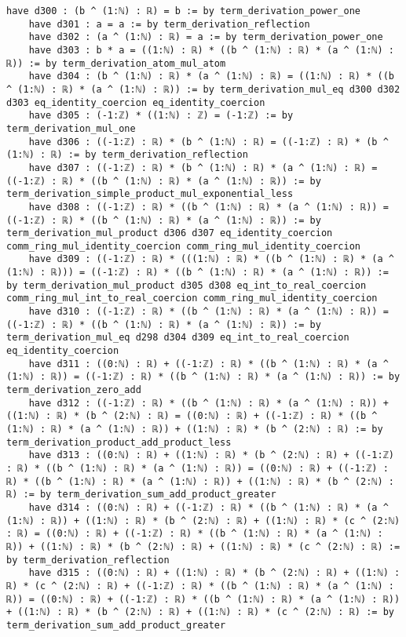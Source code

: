 \documentclass{article}
\begin{document}
\begin{tcolorbox}[colback=white!10, width=\linewidth]
\begin{lstlisting}[language=Lean4]
    have d300 : (b ^ (1:ℕ) : ℝ) = b := by term_derivation_power_one
    have d301 : a = a := by term_derivation_reflection
    have d302 : (a ^ (1:ℕ) : ℝ) = a := by term_derivation_power_one
    have d303 : b * a = ((1:ℕ) : ℝ) * ((b ^ (1:ℕ) : ℝ) * (a ^ (1:ℕ) : ℝ)) := by term_derivation_atom_mul_atom
    have d304 : (b ^ (1:ℕ) : ℝ) * (a ^ (1:ℕ) : ℝ) = ((1:ℕ) : ℝ) * ((b ^ (1:ℕ) : ℝ) * (a ^ (1:ℕ) : ℝ)) := by term_derivation_mul_eq d300 d302 d303 eq_identity_coercion eq_identity_coercion
    have d305 : (-1:ℤ) * ((1:ℕ) : ℤ) = (-1:ℤ) := by term_derivation_mul_one
    have d306 : ((-1:ℤ) : ℝ) * (b ^ (1:ℕ) : ℝ) = ((-1:ℤ) : ℝ) * (b ^ (1:ℕ) : ℝ) := by term_derivation_reflection
    have d307 : ((-1:ℤ) : ℝ) * (b ^ (1:ℕ) : ℝ) * (a ^ (1:ℕ) : ℝ) = ((-1:ℤ) : ℝ) * ((b ^ (1:ℕ) : ℝ) * (a ^ (1:ℕ) : ℝ)) := by term_derivation_simple_product_mul_exponential_less
    have d308 : ((-1:ℤ) : ℝ) * ((b ^ (1:ℕ) : ℝ) * (a ^ (1:ℕ) : ℝ)) = ((-1:ℤ) : ℝ) * ((b ^ (1:ℕ) : ℝ) * (a ^ (1:ℕ) : ℝ)) := by term_derivation_mul_product d306 d307 eq_identity_coercion comm_ring_mul_identity_coercion comm_ring_mul_identity_coercion
    have d309 : ((-1:ℤ) : ℝ) * (((1:ℕ) : ℝ) * ((b ^ (1:ℕ) : ℝ) * (a ^ (1:ℕ) : ℝ))) = ((-1:ℤ) : ℝ) * ((b ^ (1:ℕ) : ℝ) * (a ^ (1:ℕ) : ℝ)) := by term_derivation_mul_product d305 d308 eq_int_to_real_coercion comm_ring_mul_int_to_real_coercion comm_ring_mul_identity_coercion
    have d310 : ((-1:ℤ) : ℝ) * ((b ^ (1:ℕ) : ℝ) * (a ^ (1:ℕ) : ℝ)) = ((-1:ℤ) : ℝ) * ((b ^ (1:ℕ) : ℝ) * (a ^ (1:ℕ) : ℝ)) := by term_derivation_mul_eq d298 d304 d309 eq_int_to_real_coercion eq_identity_coercion
    have d311 : ((0:ℕ) : ℝ) + ((-1:ℤ) : ℝ) * ((b ^ (1:ℕ) : ℝ) * (a ^ (1:ℕ) : ℝ)) = ((-1:ℤ) : ℝ) * ((b ^ (1:ℕ) : ℝ) * (a ^ (1:ℕ) : ℝ)) := by term_derivation_zero_add
    have d312 : ((-1:ℤ) : ℝ) * ((b ^ (1:ℕ) : ℝ) * (a ^ (1:ℕ) : ℝ)) + ((1:ℕ) : ℝ) * (b ^ (2:ℕ) : ℝ) = ((0:ℕ) : ℝ) + ((-1:ℤ) : ℝ) * ((b ^ (1:ℕ) : ℝ) * (a ^ (1:ℕ) : ℝ)) + ((1:ℕ) : ℝ) * (b ^ (2:ℕ) : ℝ) := by term_derivation_product_add_product_less
    have d313 : ((0:ℕ) : ℝ) + ((1:ℕ) : ℝ) * (b ^ (2:ℕ) : ℝ) + ((-1:ℤ) : ℝ) * ((b ^ (1:ℕ) : ℝ) * (a ^ (1:ℕ) : ℝ)) = ((0:ℕ) : ℝ) + ((-1:ℤ) : ℝ) * ((b ^ (1:ℕ) : ℝ) * (a ^ (1:ℕ) : ℝ)) + ((1:ℕ) : ℝ) * (b ^ (2:ℕ) : ℝ) := by term_derivation_sum_add_product_greater
    have d314 : ((0:ℕ) : ℝ) + ((-1:ℤ) : ℝ) * ((b ^ (1:ℕ) : ℝ) * (a ^ (1:ℕ) : ℝ)) + ((1:ℕ) : ℝ) * (b ^ (2:ℕ) : ℝ) + ((1:ℕ) : ℝ) * (c ^ (2:ℕ) : ℝ) = ((0:ℕ) : ℝ) + ((-1:ℤ) : ℝ) * ((b ^ (1:ℕ) : ℝ) * (a ^ (1:ℕ) : ℝ)) + ((1:ℕ) : ℝ) * (b ^ (2:ℕ) : ℝ) + ((1:ℕ) : ℝ) * (c ^ (2:ℕ) : ℝ) := by term_derivation_reflection
    have d315 : ((0:ℕ) : ℝ) + ((1:ℕ) : ℝ) * (b ^ (2:ℕ) : ℝ) + ((1:ℕ) : ℝ) * (c ^ (2:ℕ) : ℝ) + ((-1:ℤ) : ℝ) * ((b ^ (1:ℕ) : ℝ) * (a ^ (1:ℕ) : ℝ)) = ((0:ℕ) : ℝ) + ((-1:ℤ) : ℝ) * ((b ^ (1:ℕ) : ℝ) * (a ^ (1:ℕ) : ℝ)) + ((1:ℕ) : ℝ) * (b ^ (2:ℕ) : ℝ) + ((1:ℕ) : ℝ) * (c ^ (2:ℕ) : ℝ) := by term_derivation_sum_add_product_greater

\end{lstlisting}
\end{tcolorbox}
\end{document}
